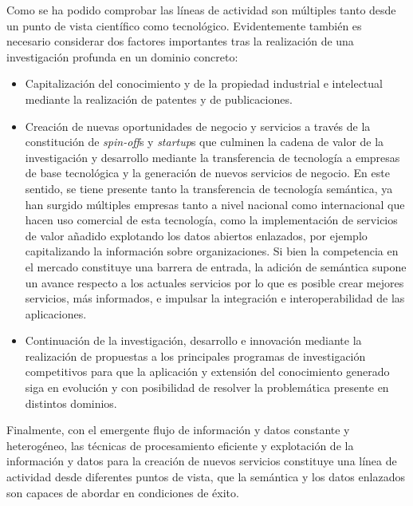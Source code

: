 Como se ha podido comprobar las líneas de actividad son múltiples tanto desde un punto de vista científico como tecnológico. Evidentemente 
también es necesario considerar dos factores importantes tras la realización de una investigación profunda en un dominio concreto:
\begin{itemize}
 \item Capitalización del conocimiento y de la propiedad industrial e intelectual mediante la realización de patentes y de publicaciones.
 \item Creación de nuevas oportunidades de negocio y servicios a través de la constitución de \textit{spin-off}s  y \textit{startup}s que 
culminen la cadena de valor de la investigación y desarrollo mediante la transferencia de tecnología a empresas de base tecnológica 
y la generación de nuevos servicios de negocio. En este sentido, se tiene presente tanto la transferencia de tecnología semántica, ya han surgido 
múltiples empresas tanto a nivel nacional como internacional que hacen uso comercial de esta tecnología, como la implementación de servicios 
de valor añadido explotando los datos abiertos enlazados, por ejemplo capitalizando la información sobre organizaciones. Si bien la competencia 
en el mercado constituye una barrera de entrada, la adición de semántica supone un avance respecto a los actuales servicios por lo que 
es posible crear mejores servicios, más informados, e impulsar la integración e interoperabilidad de las aplicaciones.
 \item Continuación de la investigación, desarrollo e innovación mediante la realización de propuestas a los principales 
programas de investigación competitivos para que la aplicación y extensión del conocimiento generado siga en evolución 
y con posibilidad de resolver la problemática presente en distintos dominios.
\end{itemize}

Finalmente, con el emergente flujo de información y datos constante y heterogéneo, las técnicas de procesamiento eficiente y explotación de la información 
y datos para la creación de nuevos servicios constituye una línea de actividad desde diferentes puntos de vista, que la semántica y los datos 
enlazados son capaces de abordar en condiciones de éxito.
